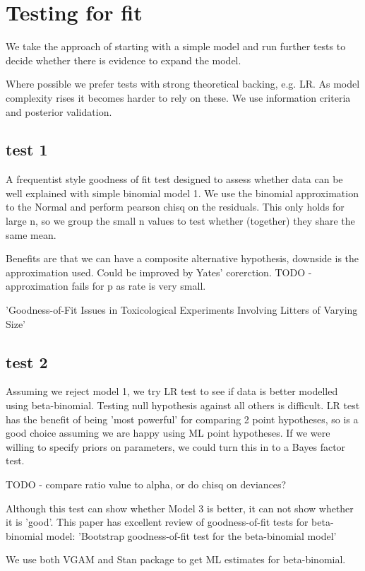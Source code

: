 \documentclass[11pt,a4,singlespacing,titlepagenumber=on]{scrreprt}
\numberwithin{equation}{chapter} %
\theoremstyle{remark}
\begin{document}
\section{Testing for fit}

We take the approach of starting with a simple model and run further tests to decide whether there is evidence to expand the model. 

Where possible we prefer tests with strong theoretical backing, e.g. LR. As model complexity rises it becomes harder to rely on these. We use information criteria and posterior validation.

\subsection{test 1} A frequentist style goodness of fit test designed to assess whether data can be well explained with simple binomial model 1. We use the binomial approximation to the Normal and perform pearson chisq on the residuals. This only holds for large n, so we group the small n values to test whether (together) they share the same mean.

Benefits are that we can have a composite alternative hypothesis, downside is the approximation used. Could be improved by Yates' corerction. TODO - approximation fails for p as rate is very small.

'Goodness-of-Fit Issues in Toxicological Experiments Involving Litters of Varying Size'

\subsection{test 2}

Assuming we reject model 1, we try LR test to see if data is better modelled using beta-binomial. Testing null hypothesis against all others is difficult. LR test has the benefit of being 'most powerful' for comparing 2 point hypotheses, so is a good choice assuming we are happy using ML point hypotheses. If we were willing to specify priors on parameters, we could turn this in to a Bayes factor test.

TODO - compare ratio value to alpha, or do chisq on deviances?

Although this test can show whether Model 3 is better, it can not show whether it is 'good'. This paper has excellent review of goodness-of-fit tests for beta-binomial model:
'Bootstrap goodness-of-fit test for the beta-binomial model'

We use both VGAM and Stan package to get ML estimates for beta-binomial.
\end{document}
